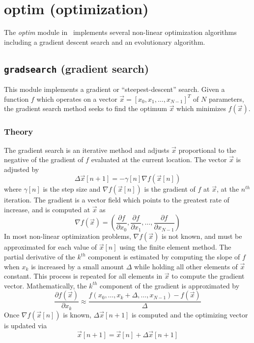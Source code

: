 % 
%

\newpage
\section{optim (optimization)}
\label{module:optim}
The {\em optim} module in \liquid\ implements several non-linear
optimization algorithms including
a gradient descent search
and an evolutionary algorithm.

\subsection{{\tt gradsearch} (gradient search)}
\label{module:optim:gradsearch}
This module implements a gradient or ``steepest-descent'' search.
Given a function $f$ which operates on a vector
$\vec{x} = [x_0,x_1,\ldots,x_{N-1}]^T$ of $N$ parameters,
the gradient search method seeks to find the optimum $\vec{x}$ which
minimizes $f(\vec{x})$.

\subsubsection{Theory}
The gradient search is an iterative method and adjusts $\vec{x}$ proportional
to the negative of the gradient of $f$ evaluated at the current location.
The vector $\vec{x}$ is adjusted by
\[
    \Delta \vec{x}[n+1] = -\gamma[n] \nabla f(\vec{x}[n])
\]
where $\gamma[n]$ is the step size and
$\nabla f(\vec{x}[n])$ is the gradient of $f$ at $\vec{x}$, at the $n^{th}$
iteration.
The gradient is a vector field which points to the greatest rate of increase,
and is computed at $\vec{x}$ as
\[
    \nabla f(\vec{x}) = \left(
        \frac{\partial f}{\partial x_0},
        \frac{\partial f}{\partial x_1},
        \ldots,
        \frac{\partial f}{\partial x_{N-1}}
    \right)
\]
In most non-linear optimization problems, $\nabla f(\vec{x})$ is not known,
and must be approximated for each value of $\vec{x}[n]$ using the finite element
method.
The partial derivative of the $k^{th}$ component is estimated by computing the
slope of $f$ when $x_k$ is increased by a small amount $\Delta$ while holding
all other elements of $\vec{x}$ constant.
This process is repeated for all elements in $\vec{x}$ to compute the gradient
vector.
Mathematically, the $k^{th}$ component of the gradient is approximated by
\[
    \frac{\partial f(\vec{x})}{\partial x_k} \approx 
    \frac{f(x_0,\ldots,x_k+\Delta,\ldots,x_{N-1}) - f(\vec{x})}{\Delta}
\]
Once $\nabla f(\vec{x}[n])$ is known, $\Delta\vec{x}[n+1]$ is computed and the
optimizing vector is updated via
\[
    \vec{x}[n+1] = \vec{x}[n] + \Delta\vec{x}[n+1]
\]


